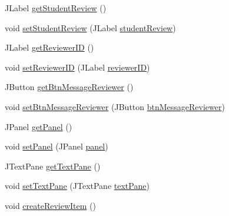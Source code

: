 \begin{DoxyCompactItemize}
\item 
J\+Label \mbox{\hyperlink{classcom_1_1_b_n_u_1_1pages_1_1_user_review_1_1_review_model_a98e9cd56ff8ab78d3e29a0f484ee893e}{get\+Student\+Review}} ()
\item 
void \mbox{\hyperlink{classcom_1_1_b_n_u_1_1pages_1_1_user_review_1_1_review_model_ad7cbe8cf3b95b43f21c885314c464b79}{set\+Student\+Review}} (J\+Label \mbox{\hyperlink{classcom_1_1_b_n_u_1_1pages_1_1_user_review_1_1_review_model_a38257cb5e6e3d98d816b26e81ade4c57}{student\+Review}})
\item 
J\+Label \mbox{\hyperlink{classcom_1_1_b_n_u_1_1pages_1_1_user_review_1_1_review_model_a38f1941ba5576d901c9741a49564c76e}{get\+Reviewer\+ID}} ()
\item 
void \mbox{\hyperlink{classcom_1_1_b_n_u_1_1pages_1_1_user_review_1_1_review_model_a0795a276cf6fa649f904f27c91bbbe5f}{set\+Reviewer\+ID}} (J\+Label \mbox{\hyperlink{classcom_1_1_b_n_u_1_1pages_1_1_user_review_1_1_review_model_a20f5ab1dc2358bd6e40c18a716555d7a}{reviewer\+ID}})
\item 
J\+Button \mbox{\hyperlink{classcom_1_1_b_n_u_1_1pages_1_1_user_review_1_1_review_model_ad46eb04d512457d9610b9c6c5bd826b5}{get\+Btn\+Message\+Reviewer}} ()
\item 
void \mbox{\hyperlink{classcom_1_1_b_n_u_1_1pages_1_1_user_review_1_1_review_model_a69c671c74469e06bbd92b1388b2bb4ae}{set\+Btn\+Message\+Reviewer}} (J\+Button \mbox{\hyperlink{classcom_1_1_b_n_u_1_1pages_1_1_user_review_1_1_review_model_a1962a3667958b34cac78d5908b6192f0}{btn\+Message\+Reviewer}})
\item 
J\+Panel \mbox{\hyperlink{classcom_1_1_b_n_u_1_1pages_1_1_user_review_1_1_review_model_a679922852b0923633a75f68c891194b8}{get\+Panel}} ()
\item 
void \mbox{\hyperlink{classcom_1_1_b_n_u_1_1pages_1_1_user_review_1_1_review_model_a7c4a0f2e32fa3be5cb62948687f6f483}{set\+Panel}} (J\+Panel \mbox{\hyperlink{classcom_1_1_b_n_u_1_1pages_1_1_user_review_1_1_review_model_a3ed0ddf2c2f64bd2a19239cc939a0a96}{panel}})
\item 
J\+Text\+Pane \mbox{\hyperlink{classcom_1_1_b_n_u_1_1pages_1_1_user_review_1_1_review_model_aeb534545678d85834c841a44086723a9}{get\+Text\+Pane}} ()
\item 
void \mbox{\hyperlink{classcom_1_1_b_n_u_1_1pages_1_1_user_review_1_1_review_model_ab36e0061b31eff81011a2aa29dafc975}{set\+Text\+Pane}} (J\+Text\+Pane \mbox{\hyperlink{classcom_1_1_b_n_u_1_1pages_1_1_user_review_1_1_review_model_a64332dab97f2261d046f4dc5cba37f02}{text\+Pane}})
\item 
void \mbox{\hyperlink{classcom_1_1_b_n_u_1_1pages_1_1_user_review_1_1_review_model_a638b6ce7359eae8ba42e49032bbc7756}{create\+Review\+Item}} ()
\end{DoxyCompactItemize}
